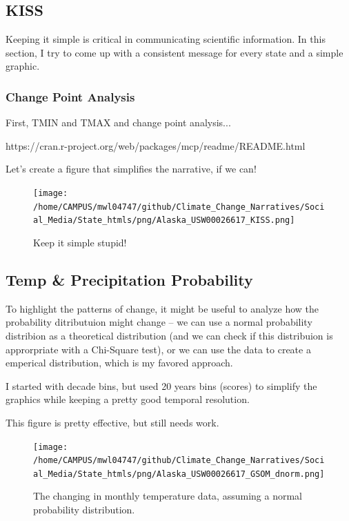 \documentclass{article}\usepackage[]{graphicx}\usepackage[]{color}
\begin{document}
\subsection{KISS}

Keeping it simple is critical in communicating scientific information. In this section, I try to come up with a consistent message for every state and a simple graphic. 

\subsubsection{Change Point Analysis}
First, TMIN and TMAX and change point analysis...

https://cran.r-project.org/web/packages/mcp/readme/README.html



Let's create a figure that simplifies the narrative, if we can!



\begin{figure}
\texttt{[image: /home/CAMPUS/mwl04747/github/Climate\_Change\_Narratives/Social\_Media/State\_htmls/png/Alaska\_USW00026617\_KISS.png]}
\caption{Keep it simple stupid!}
\label{fig:GSOM-KISS}
\end{figure}

\subsection{Temp \& Precipitation Probability}

To highlight the patterns of change, it might be useful to analyze how the probability ditributuion might change -- we can use a normal probability distribion as a theoretical distribution (and we can check if this distribuion is approrpriate with a Chi-Square test), or we can use the data to create a emperical distribution, which is my favored approach. 

I started with decade bins, but used 20 years bins (scores) to simplify the graphics while keeping a pretty good temporal resolution.



This figure is pretty effective, but still needs work. 

\begin{figure}
\texttt{[image: /home/CAMPUS/mwl04747/github/Climate\_Change\_Narratives/Social\_Media/State\_htmls/png/Alaska\_USW00026617\_GSOM\_dnorm.png]}
\caption{The changing in monthly temperature data, assuming a normal probability distribution.}
\label{fig:GSOM_dnorm}
\end{figure}
\end{document}
